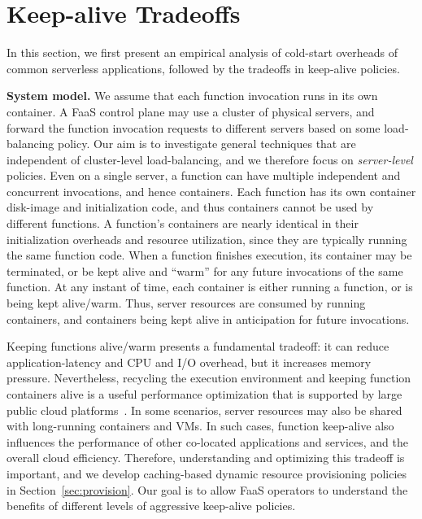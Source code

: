 \section{Keep-alive Tradeoffs}
\label{sec:tradeoffs}


In this section, we first present an empirical analysis of cold-start overheads of common serverless applications, followed by the tradeoffs in keep-alive policies. 

\noindent \textbf{System model.} 
We assume that each function invocation runs in its own container. 
%
A FaaS control plane may use a cluster of physical servers, and forward the function invocation requests to different servers based on some load-balancing policy. 
Our aim is to investigate general techniques that are independent of cluster-level load-balancing, and we therefore focus on \emph{server-level} policies. 
Even on a single server, a function can have multiple independent and concurrent invocations, and hence containers. 
Each function has its own container disk-image and initialization code, and thus containers cannot be used by different functions. 
A function's containers are nearly identical in their initialization overheads and resource utilization, since they are typically running the same function code. 
%
When a function finishes execution, its container may be terminated, or be kept alive and ``warm'' for any future invocations of the same function. 
%
At any instant of time, each container is either running a function, or is being kept alive/warm. %
%
Thus, server resources are consumed by running containers, and containers being kept alive in anticipation for future invocations. 


Keeping functions alive/warm presents a fundamental tradeoff: it can reduce application-latency and CPU and I/O overhead, but it increases memory pressure. 
Nevertheless, recycling the execution environment and keeping function containers alive is a useful performance optimization that is supported by large public cloud platforms~\cite{goog-functions-tricks,aws-warm-predictable,azure-warmup-trigger}. 
%
In some scenarios, server resources may also be shared with long-running containers and VMs. 
In such cases, function keep-alive also influences the performance of other co-located applications and services, and the overall cloud efficiency. 
Therefore, understanding and optimizing this tradeoff is important, and we develop caching-based dynamic resource provisioning policies in Section~\ref{sec:provision}. 
Our goal is to allow FaaS operators to understand the benefits of different levels of aggressive keep-alive policies. 


